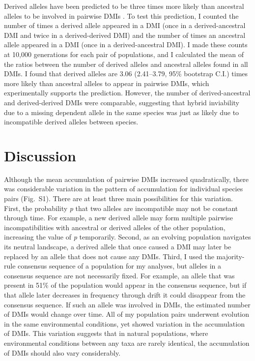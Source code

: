 \begin{doublespace}
Derived alleles have been predicted to be three times more likely
than ancestral alleles to be involved in pairwise DMIs \citep{orr95}.
%
To test this prediction, I counted the number of times
a derived allele appeared in a DMI
(once in a derived-ancestral DMI and twice in a derived-derived DMI)
and the number of times an ancestral allele appeared in a DMI
(once in a derived-ancestral DMI).
%
I made these counts at 10,000 generations for each pair of populations,
and I calculated the mean of the ratios between the number of derived alleles
and ancestral alleles found in all DMIs.
%
I found that derived alleles are 3.06 (2.41--3.79, 95\% bootstrap C.I.)
times more likely than ancestral alleles to appear in pairwise DMIs,
which experimentally supports the prediction.
%
However, the number of derived-ancestral and derived-derived DMIs
were comparable, suggesting that hybrid inviability due to
a missing dependent allele in the same species was just as likely due to
incompatible derived alleles between species.



\section{Discussion}



Although the mean accumulation of pairwise DMIs increased quadratically,
there was considerable variation in the pattern of accumulation
for individual species pairs (Fig.~S1).
%
There are at least three main possibilities for this variation.
%
First, the probability \emph{p} that two alleles are incompatible
may not be constant through time.
%
For example, a new derived allele may form multiple pairwise incompatibilities
with ancestral or derived alleles of the other population,
increasing the value of \emph{p} temporarily.
%
Second, as an evolving population navigates its neutral landscape,
a derived allele that once caused a DMI may later be replaced
by an allele that does not cause any DMIs.
%
Third, I used the majority-rule consensus sequence
of a population for my analyses,
but alleles in a consensus sequence are not necessarily fixed.
%
For example, an allele that was present in 51\% of the population
would appear in the consensus sequence,
but if that allele later decreases in frequency through drift
it could disappear from the consensus sequence.
%
If such an allele was involved in DMIs,
the estimated number of DMIs would change over time.
%
All of my population pairs underwent evolution
in the same environmental conditions,
yet showed variation in the accumulation of DMIs.
%
This variation suggests that in natural populations,
where environmental conditions between any taxa are rarely identical,
the accumulation of DMIs should also vary considerably.



\end{doublespace}
